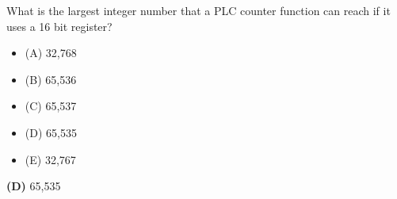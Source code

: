 

What is the largest integer number that a PLC counter function can reach if it uses a 16 bit register?

\begin{itemize}
\item{(A)} 32,768
\vskip 5pt 
\item{(B)} 65,536
\vskip 5pt 
\item{(C)} 65,537
\vskip 5pt 
\item{(D)} 65,535
\vskip 5pt 
\item{(E)} 32,767
\end{itemize}







{\bf (D)} 65,535
 










